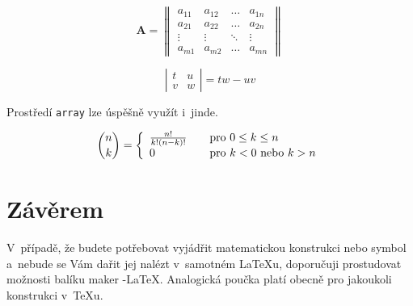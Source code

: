 \documentclass[11pt,a4paper,twocolumn,titlepage]{article}
\theoremstyle{definition}
\theoremstyle{plain}
\begin{document}
$$\mathbf{A}=\left\|\begin{array}{cccc}
a_{11} & a_{12} & \ldots & a_{1n} \\
a_{21} & a_{22} & \ldots & a_{2n} \\
\vdots & \vdots & \ddots & \vdots \\
a_{m1} & a_{m2} & \ldots & a_{mn}
\end{array}\right\|$$

$$ \left| \begin{array}{cc}
t & u \\
v & w 
\end{array} \right| = tw - uv $$

Prostředí \texttt{array} lze úspěšně využít i~jinde.

$$\binom{n}{k} = \left\{ 
\begin{array}{l l}
\frac{n!}{k!(n-k)!} & \quad \mbox{pro } 0 \leq k \leq n \\
0 & \quad \mbox{pro $k < 0$ nebo $k > n$} \\
\end{array} \right. $$

\section{Závěrem}
V~případě, že budete potřebovat vyjádřit matematickou konstrukci nebo symbol a~nebude se Vám dařit jej nalézt v~samotném \LaTeX u{}, 
doporučuji prostudovat možnosti balíku maker \AmS-\LaTeX.
Analogická poučka platí obecně pro jakoukoli konstrukci v~\TeX u{}.
\end{document}
